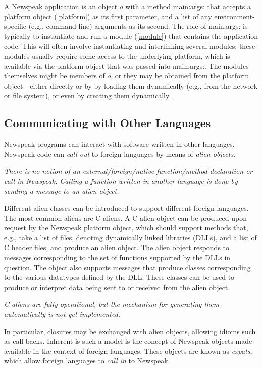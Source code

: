 \documentclass{article}
\newcommand{\code}[1]{{\sf #1}}
\begin{document}
A Newspeak application is an object $o$ with a method \code{main:args:} that accepts a platform object (\ref{platform})  as its first parameter, and a list of any environment-specific (e.g., command line) arguments as its second.  The role of \code{main:args:} is typically to instantiate and run a module  (\ref{module}) that contains the application code. This will often involve instantiating and interlinking several modules; these modules usually require some access to the underlying platform, which is available via the platform object that was passed into \code{main:args:}. The modules themselves might be members of $o$, or they may be obtained from the platform object - either directly or by by loading them dynamically  (e.g., from the network or file system), or even by creating them dynamically.


\subsection{Communicating with Other Languages}
\label{aliens}

Newspeak programs can interact with software written in other languages. Newspeak code can {\em call out} to foreign languages by means of {\em alien objects}. 

{\it
There is no notion of an external/foreign/native function/method declaration or call in Newspeak.
Calling a function written in another language is done by sending a message to an alien object.
}

Different alien classes can be introduced to support different foreign languages. The most common aliens are C aliens. A C alien object can be produced upon request by the Newspeak platform object, which should
support methods that, e.g., take a list of files, denoting dynamically linked libraries (DLLs), and a list of C header files, and produce an alien object. The alien object  responds to messages corresponding to the set of functions supported by the DLLs in question.  The object also supports messages
that produce classes corresponding to the various datatypes defined by the DLL.  These classes can be used to produce or interpret data being sent to or received from the alien object.

{\it C aliens are fully operational, but the mechanism for generating them automatically is not yet implemented.}

In particular, closures may be exchanged with alien objects, allowing idioms such as call backs. Inherent is such a model is the concept of Newspeak objects made available in the context of foreign languages. These objects are known as {\em expats}, which allow 
foreign languages to {\em call in} to Newspeak.
\end{document}

